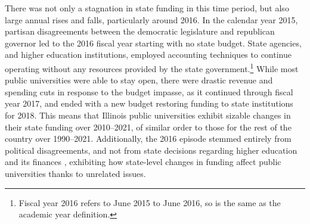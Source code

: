 There was not only a stagnation in state funding in this time period, but also large annual rises and falls, particularly around 2016.
In the calendar year 2015, partisan disagreements between the democratic legislature and republican governor led to the 2016 fiscal year starting with no state budget.
State agencies, and higher education institutions, employed accounting techniques to continue operating without any resources provided by the state government.\footnote{
    Fiscal year 2016 refers to June 2015 to June 2016, so is the same as the academic year definition.
}
While most public universities were able to stay open, there were drastic revenue and spending cuts in response to the budget impasse, as it continued through fiscal year 2017, and ended with a new budget restoring funding to state institutions for 2018.
This means that Illinois public universities exhibit sizable changes in their state funding over 2010--2021, of similar order to those for the rest of the country over 1990--2021.
Additionally, the 2016 episode stemmed entirely from political disagreements, and not from state decisions regarding higher education and its finances \citep{young2020squandered}, exhibiting how state-level changes in funding affect public universities thanks to unrelated issues. 

